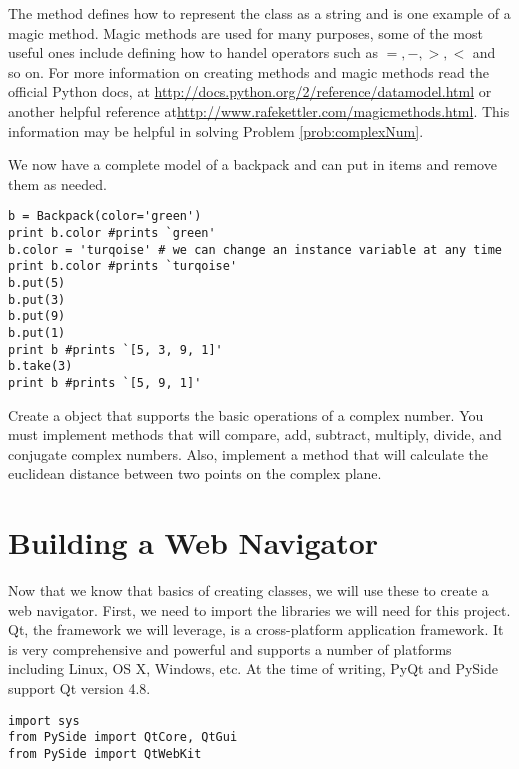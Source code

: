 The  method defines how to represent the class as a string and is one example of a magic method.
Magic methods are used for many purposes, some of the most useful ones include defining how to handel operators such as $ =, - , >, <$ and so on.
For more information on creating methods and magic methods read the official Python docs, at \url {http://docs.python.org/2/reference/datamodel.html} or another helpful reference at\url{http://www.rafekettler.com/magicmethods.html}.
This information may be helpful in solving Problem \ref{prob:complexNum}.

We now have a complete model of a backpack and can put in items and remove them as needed.

\begin{lstlisting}
b = Backpack(color='green')
print b.color #prints `green'
b.color = 'turqoise' # we can change an instance variable at any time
print b.color #prints `turqoise'
b.put(5)
b.put(3)
b.put(9)
b.put(1)
print b #prints `[5, 3, 9, 1]'
b.take(3)
print b #prints `[5, 9, 1]'
\end{lstlisting}


\begin{problem}
Create a  object that supports the basic operations of a complex number.
You must implement methods that will compare, add, subtract, multiply, divide, and conjugate complex numbers.
Also, implement a  method that will calculate the euclidean distance between two points on the complex plane.
\label{prob:complexNum}
\end{problem}

\section*{Building a Web Navigator}
Now that we know that basics of creating classes, we will use these to create a web navigator.
First, we need to import the libraries we will need for this project.
Qt, the framework we will leverage, is a cross-platform application framework.
It is very comprehensive and powerful and supports a number of platforms including Linux, OS X, Windows, etc.
At the time of writing, PyQt and PySide support Qt version 4.8.
\begin{lstlisting}
import sys
from PySide import QtCore, QtGui
from PySide import QtWebKit
\end{lstlisting}

